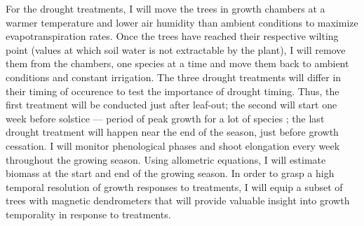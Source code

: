 \documentclass[12pt]{article}
\begin{document}
For the drought treatments, I will move the trees in growth chambers at a warmer temperature and lower air humidity than ambient conditions to maximize evapotranspiration rates. Once the trees have reached their respective wilting point (values at which soil water is not extractable by the plant), I will remove them from the chambers, one species at a time and move them back to ambient conditions and constant irrigation. The three drought treatments will differ in their timing of occurence to test the importance of drought timing. Thus, the first treatment will be conducted just after leaf-out; the second will start one week before solstice --- period of peak growth for a lot of species \citep{anderson-teixeira_carbon_2021,dorangeville_drought_2018,mcmahon_general_2015}; the last drought treatment will happen near the end of the season, just before growth cessation. I will monitor phenological phases and shoot elongation every week throughout the growing season. Using allometric equations, I will estimate biomass at the start and end of the growing season. In order to grasp a high temporal resolution of growth responses to treatments, I will equip a subset of trees with magnetic dendrometers that will provide valuable insight into growth temporality in response to treatments. \\
\end{document}
